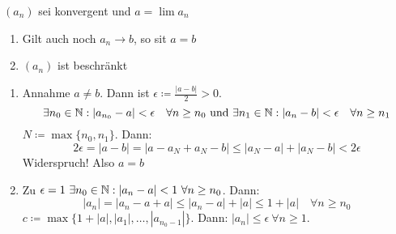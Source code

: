 \begin{satz} \label{satz-2.1}
	$(a_{n})$ sei konvergent und $a = \lim a_{n}$
	\begin{enumerate}
		\item Gilt auch noch $a_{n} \rightarrow b$, so sit $a = b$
		\item $(a_{n})$ ist beschränkt
	\end{enumerate}
\end{satz}

\begin{beweis}
	\begin{enumerate}
		\item Annahme $a \neq b$. Dann ist $\epsilon \coloneqq \frac{|a - b|}{2} > 0$.
			$$
			\exists n_{0} \in \mathbb{N}: |a_{n_{0}} - a| < \epsilon \quad \forall n \geq n_{0} \text{ und } \exists n_{1} \in \mathbb{N}: |a_n - b| < \epsilon \quad \forall n \geq n_{1}
			$$
			$N \coloneqq \max \{ n_{0}, n_{1} \}$. Dann:
			$$
				2 \epsilon = |a - b| = | a - a_{N} + a_{N} - b| \leq |a_{N} - a| + |a_{N} - b| < 2 \epsilon
			$$
			Widerspruch! Also $ a = b$
		\item  Zu $\epsilon = 1 ~\exists n_{0} \in \mathbb{N}: |a_{n} - a| < 1 ~\forall n \geq n_{0}$. Dann:
			$$
				|a_{n}| = |a_{n} - a + a| \leq |a_{n} - a| + |a| \leq 1 + |a| \quad \forall n \geq n_{0}
			$$
			$c \coloneqq \max \{ 1 + |a|, |a_{1}|, \dotsc, |a_{n_{0} - 1}| \}$. Dann: $|a_{n}| \leq \epsilon ~\forall n \geq 1$.
	\end{enumerate}
\end{beweis}



